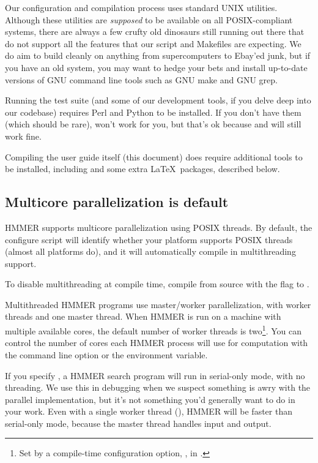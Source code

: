 Our configuration and compilation process uses standard UNIX
utilities. Although these utilities are \emph{supposed} to be
available on all POSIX-compliant systems, there are always a few
crufty old dinosaurs still running out there that do not support all
the features that our  script and Makefiles are
expecting. We do aim to build cleanly on anything from supercomputers
to Ebay'ed junk, but if you have an old system, you may want to hedge
your bets and install up-to-date versions of GNU command line tools
such as GNU make and GNU grep.

Running the test suite (and some of our development tools, if you
delve deep into our codebase) requires Perl and Python to be
installed.  If you don't have them (which should be rare),  won't work for you, but that's ok because  and
 will still work fine.

Compiling the user guide itself (this document) does require
additional tools to be installed, including  and some extra
\LaTeX\ packages, described below.


\subsection{Multicore parallelization is default}

HMMER supports multicore parallelization using POSIX threads. By
default, the configure script will identify whether your platform
supports POSIX threads (almost all platforms do), and it will
automatically compile in multithreading support.

To disable multithreading at compile time, compile from source with
the  flag to .

Multithreaded HMMER programs use master/worker parallelization, with
 worker threads and one master thread. When HMMER is run on
a machine with multiple available cores, the default number of worker
threads is two\footnote{Set by a compile-time configuration option,
  , in .}. You can control the
number of cores each HMMER process will use for computation with the
 command line option or the 
environment variable.

If you specify , a HMMER search program will run in
serial-only mode, with no threading. We use this in debugging when we
suspect something is awry with the parallel implementation, but it's
not something you'd generally want to do in your work.  Even with a
single worker thread (), HMMER will be faster than
serial-only mode, because the master thread handles input and output.

